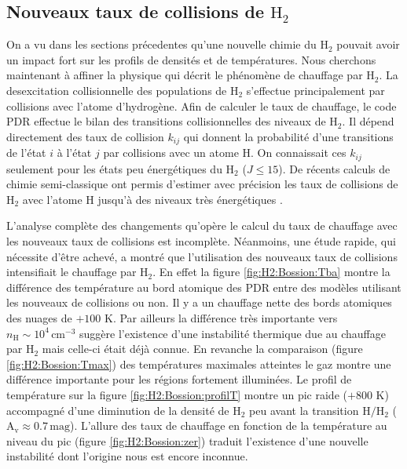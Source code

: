 \subsection{Nouveaux taux de collisions de $\mathrm{H}_2$}

On a vu dans les sections précedentes qu'une nouvelle chimie du $\mathrm{H}_2$ pouvait avoir un impact fort sur les profils de densités et de températures. Nous cherchons maintenant à affiner la physique qui décrit le phénomène de chauffage par $\mathrm{H}_2$. La desexcitation collisionnelle des populations de $\mathrm{H}_2$ s'effectue principalement par collisions avec l'atome d'hydrogène. Afin de calculer le taux de chauffage, le code PDR effectue le bilan des transitions collisionnelles des niveaux de $\mathrm{H}_2$. Il dépend directement des taux de collision $k_{ij}$ qui donnent la probabilité d'une transitions de l'état $i$ à l'état $j$ par collisions avec un atome $\mathrm{H}$. On connaissait ces $k_{ij}$ seulement pour les états peu énergétiques du $\mathrm{H}_2$ ($J\leq15$). De récents calculs de chimie semi-classique ont permis d'estimer avec précision les taux de collisions de $\mathrm{H}_2$ avec l'atome $\mathrm{H}$ jusqu'à des niveaux très énergétiques \cite{Bossion}. \newline 

L'analyse complète des changements qu'opère le calcul du taux de chauffage avec les nouveaux taux de collisions est incomplète. Néanmoins, une étude rapide, qui nécessite d'être achevé, a montré que l'utilisation des nouveaux taux de collisions intensifiait le chauffage par $\mathrm{H}_2$. En effet la figure \ref{fig:H2:Bossion:Tba} montre la différence des température au bord atomique des PDR entre des modèles utilisant les nouveaux de collisions ou non. Il y a un chauffage nette des bords atomiques des nuages de $+100$ K. Par ailleurs la différence très importante vers $n_\mathrm{H} \sim 10^4\,\mathrm{cm}^{-3}$ suggère l'existence d'une instabilité thermique due au chauffage par $\mathrm{H}_2$ mais celle-ci était déjà connue. En revanche la comparaison (figure \ref{fig:H2:Bossion:Tmax}) des températures maximales atteintes le gaz montre une différence importante pour les régions fortement illuminées. Le profil de température sur la figure \ref{fig:H2:Bossion:profilT} montre un pic raide ($+800$ K) accompagné d'une diminution de la densité de $\mathrm{H}_2$ peu avant la transition $\mathrm{H}/\mathrm{H}_2$ ($\mathrm{A}_\mathrm{v} \approx 0.7 \,\mathrm{mag}$). L'allure des taux de chauffage en fonction de la température au niveau du pic (figure \ref{fig:H2:Bossion:zer}) traduit l'existence d'une nouvelle instabilité dont l'origine nous est encore inconnue. \newline 

